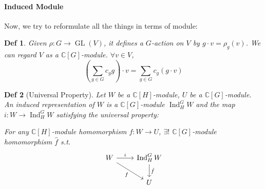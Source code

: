 \documentclass[a4paper]{article}
\newcommand*{\Cb}{\mathbb{C}}
\DeclareMathOperator{\Ind}{Ind}
\newcommand*\GL[1]{\operatorname{GL}\mathopen{}\left({#1}\right)\mathclose{}}
\theoremstyle{mystyle}
\newtheorem{definition}{Def}
\begin{document}
\paragraph{Induced Module}
Now, we try to reformulate all the things in terms of module:

\begin{definition}
  Given $\rho: G\to \GL{V}$, it defines a $G$-action on $V$ by
  $g\cdot v = \rho_g(v)$. We can regard $V$ as a $\Cb[G]$-module.
  $\forall v \in V$,
  \[
    \left(\sum_{g\in G} c_g g\right) \cdot v
    =\sum_{g\in G} c_g (g\cdot v)
  \]
\end{definition}

\begin{definition}[Universal Property]
  Let $W$ be a $\Cb[H]$-module, $U$ be a $\Cb[G]$-module.
  An induced representation of $W$ is a $\Cb[G]$-module $\Ind^G_H W$ and the
  map $i: W \to \Ind^G_H W$ satisfying the universal property:
  
  For any $\Cb[H]$-module homomorphism $f: W\to U$, $\exists!$ $\Cb[G]$-module
  homomorphism $\hat{f}$ s.t.
  \[
    \begin{tikzcd}
      W \arrow[r, "i"] \arrow[dr, "f"'] & \Ind^G_H W \arrow[d, "\hat{f}"] \\
                                        & U
    \end{tikzcd}
  \]
\end{definition}
\end{document}
